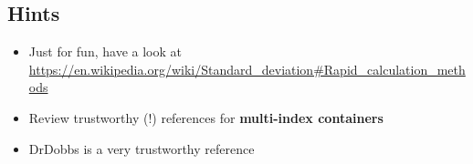 \documentclass[]{article}
\providecommand{\tightlist}{%
  \setlength{\itemsep}{0pt}\setlength{\parskip}{0pt}}
\begin{document}
\subsection{Hints}\label{hints}

\begin{itemize}
\tightlist
\item
  Just for fun, have a look at
  \url{https://en.wikipedia.org/wiki/Standard_deviation\#Rapid_calculation_methods}
\item
  Review trustworthy (!) references for \textbf{multi-index containers}
\item
  DrDobbs is a very trustworthy reference
\end{itemize}
\end{document}
